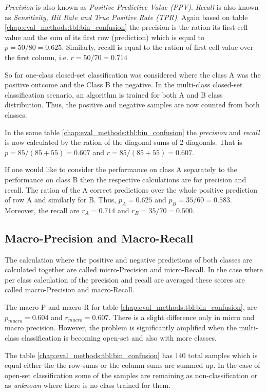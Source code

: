 \textit{Precision} is also known as \textit{Positive Predictive Value (PPV)}. \textit{Recall} is also known as \textit{Sensitivity, Hit Rate and True Positive Rate (TPR)}. Again based on table \ref{chap:eval_methods:tbl:bin_confusion} the precision is the ration its first cell value and the sum of its first row (prediction) which is equal to $p = 50 / 80 = 0.625$. Similarly, recall is equal to the ration of first cell value over the first column, i.e. $r = 50 / 70 = 0.714$

So far one-class closed-set classification was considered where the class A was the positive outcome and the Class B the negative. In the multi-class closed-set classification scenario, an algorithm is trained for both A and B class distribution. Thus, the positive and negative samples are now counted from both classes.

In the same table \ref{chap:eval_methods:tbl:bin_confusion} the \textit{precision} and \textit{recall} is now calculated by the ration of the diagonal sums of 2 diagonals. That is $p = 85 / (85 + 55) = 0.607$ and $r = 85 / (85 + 55) = 0.607$. 

If one would like to consider the performance on class A separately to the performance on class B then the respective calculations are for precision and recall. The ration of the A correct predictions over the whole positive prediction of row A and similarly for B. Thus, $p_{A} = 0.625$ and $p_{B} = 35 / 60 = 0.583$. Moreover, the recall are $r_{A} = 0.714$ and $r_{B} = 35 / 70 = 0.500$.

\subsection{Macro-Precision and Macro-Recall}\label{chap:eval_methods:sec:prf_macro}

The calculation where the positive and negative predictions of both classes are calculated together are called micro-Precision and micro-Recall. In the case where per class calculation of the precision and recall are averaged these scores are called macro-Precision and macro-Recall. 

The macro-P and macro-R for table \ref{chap:eval_methods:tbl:bin_confusion}, are $p_{macro} = 0.604$ and $r_{macro} = 0.607$. There is a slight difference only in micro and macro precision. However, the problem is significantly amplified when the multi-class classification is becoming open-set and also with more classes.

The table \ref{chap:eval_methods:tbl:bin_confusion} has $140$ total samples which is equal either the the row-sums or the column-sums are summed up. In the case of open-set classification some of the samples are remaining as non-classification or as \textit{unknown} where there is no class trained for them. 

